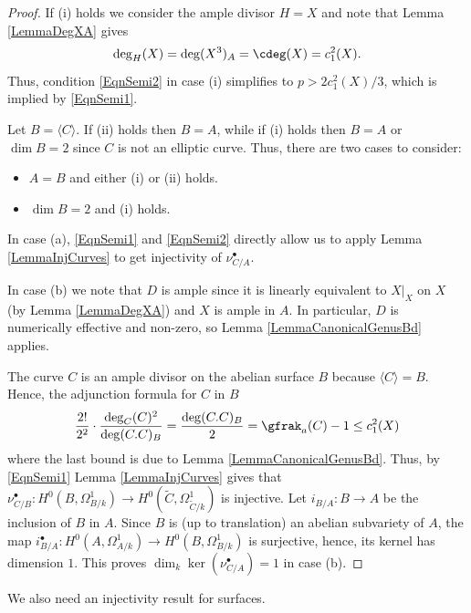 \begin{proof} If (i) holds we consider the ample divisor $H=X$ and note that Lemma \ref{LemmaDegXA} gives
$$
\deg_H(X)=\deg(X^3)_A=\cdeg(X)=c_1^2(X).
$$
Thus, condition \eqref{EqnSemi2} in case (i) simplifies to $p>2c_1^2(X)/3$, which is implied by \eqref{EqnSemi1}.


Let $B=\langle C\rangle$. If (ii) holds then $B=A$, while if (i) holds then $B=A$ or $\dim B=2$ since $C$ is not an elliptic curve. Thus, there are two cases to consider:
\begin{itemize}
\item[(a)] $A=B$ and either (i) or (ii) holds.
\item[(b)] $\dim B=2$ and (i) holds.
\end{itemize}


In case (a),  \eqref{EqnSemi1} and \eqref{EqnSemi2} directly allow us to apply Lemma \ref{LemmaInjCurves} to get injectivity of $\nu_{C/A}^\bullet$.




In case (b) we note that $D$ is ample since it is linearly equivalent to $X|_X$ on $X$ (by Lemma \ref{LemmaDegXA}) and $X$ is ample in $A$. In particular, $D$ is numerically effective and non-zero, so Lemma \ref{LemmaCanonicalGenusBd} applies.


The curve $C$ is an ample divisor on the abelian surface $B$ because $\langle C\rangle =B$. Hence, the adjunction formula for $C$ in $B$
$$
\begin{aligned}
\frac{2!}{2^2}\cdot \frac{\deg_{C}(C)^2}{\deg(C.C)_B}=\frac{\deg(C.C)_B}{2}=\gfrak_a(C)-1\le c_1^2(X)
\end{aligned}
$$
where the last bound is due to Lemma \ref{LemmaCanonicalGenusBd}. Thus, by \eqref{EqnSemi1}  Lemma \ref{LemmaInjCurves} gives that $\nu_{C/B}^\bullet:H^0(B,\Omega^1_{B/k})\to H^0(\widetilde{C},\Omega^1_{\widetilde{C}/k})$ is injective. Let $i_{B/A}:B\to A$ be the inclusion of $B$ in $A$. Since $B$ is (up to translation) an abelian subvariety of $A$, the map $i_{B/A}^\bullet:H^0(A,\Omega^1_{A/k})\to H^0(B,\Omega^1_{B/k})$ is surjective, hence, its kernel has dimension $1$. This proves $\dim_k \ker(\nu_{C/A}^\bullet)=1$ in case (b).
\end{proof}




We also need an injectivity result for surfaces.

